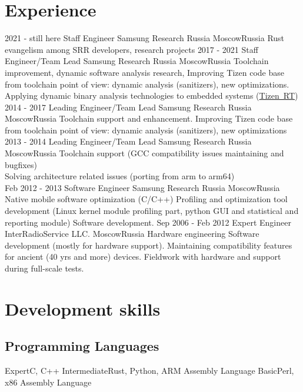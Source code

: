 \documentclass[11pt,a4paper]{moderncv}
\begin{document}
\section{Experience}
\cventry
  {2021 - still here}
  {Staff Engineer}
  {Samsung Research Russia}
  {Moscow}{Russia}
  {Rust evangelism among SRR developers, research projects}
\cventry
  {2017 - 2021}
  {Staff Engineer/Team Lead}
  {Samsung Research Russia}
  {Moscow}{Russia}
  {Toolchain improvement, dynamic software analysis research, Improving Tizen
    code base from toolchain point of view: dynamic analysis (sanitizers), new
    optimizations. Applying dynamic binary analysis technologies to embedded
    systems (\href{https://github.com/Samsung/TizenRT}{Tizen~RT})}
\cventry
  {2014 - 2017}
  {Leading Engineer/Team Lead}
  {Samsung Research Russia}
  {Moscow}{Russia}
  {Toolchain support and enhancement. Improving Tizen code base from toolchain point of view: dynamic analysis
    (sanitizers), new optimizations}
\cventry
  {2013 - 2014}
  {Leading Engineer/Team Lead}
  {Samsung Research Russia}
  {Moscow}{Russia}
  {Toolchain support (GCC compatibility issues maintaining and bugfixes)\\
Solving architecture related issues (porting from arm to arm64)\\}
\cventry
  {Feb 2012 - 2013}
  {Software Engineer}
  {Samsung Research Russia}
  {Moscow}{Russia}
  {Native mobile software optimization (C/C++)\newline{}
Profiling and optimization tool development (Linux kernel module profiling part, python GUI and statistical and reporting module)\newline{}
Software development.}
\cventry
  {Sep 2006 - Feb 2012}
  {Expert Engineer}
  {InterRadioService LLC.}
  {Moscow}{Russia}
  {Hardware engineering\newline{}
Software development (mostly for hardware support).\newline{}
Maintaining compatibility features for ancient (40 yrs and more) devices.\newline{}
Fieldwork with hardware and support during full-scale tests.\newline{}}

\section{Development skills}
\subsection{Programming Languages}
\cvitem
  {Expert}{C, C++}
\cvitem
  {Intermediate}{Rust, Python, ARM Assembly Language}
\cvitem
  {Basic}{Perl, x86 Assembly Language}
\end{document}

